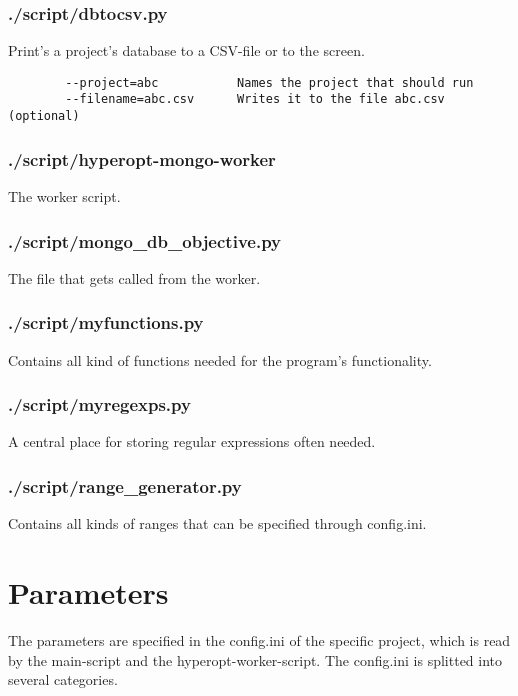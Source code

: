 \documentclass[]{scrartcl}
\begin{document}
\subsubsection{./script/dbtocsv.py}

Print's a project's database to a CSV-file or to the screen.

\begin{verbatim}
        --project=abc           Names the project that should run
        --filename=abc.csv      Writes it to the file abc.csv (optional)
\end{verbatim}

\subsubsection{./script/hyperopt-mongo-worker}

The worker script. \ntbc

\subsubsection{./script/mongo\_db\_objective.py}

The file that gets called from the worker. \ntbc

\subsubsection{./script/myfunctions.py}

Contains all kind of functions needed for the program's functionality. \ntbc

\subsubsection{./script/myregexps.py}

A central place for storing regular expressions often needed. \ntbc

\subsubsection{./script/range\_generator.py}

Contains all kinds of ranges that can be specified through config.ini. \ntbc

\section{Parameters}

The parameters are specified in the config.ini of the specific project, which is read by the main-script and
the hyperopt-worker-script. The config.ini is splitted into several categories.
\end{document}
